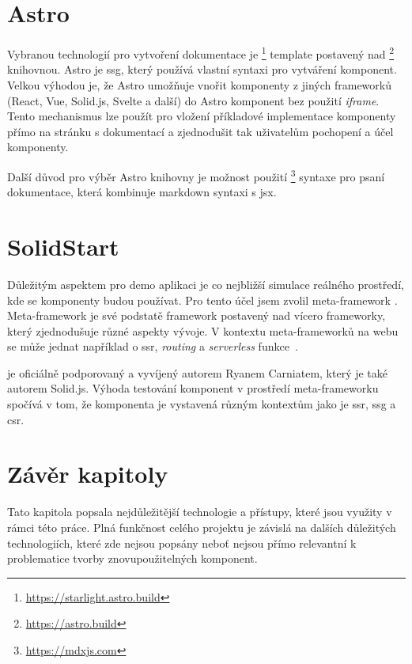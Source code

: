 \section{Astro}

Vybranou technologií pro vytvoření dokumentace je \footnote{\url{https://starlight.astro.build}} template postavený nad \footnote{\url{https://astro.build}} knihovnou.
Astro je \gls{ssg}, který používá vlastní syntaxi pro vytváření komponent.
Velkou výhodou je, že Astro umožňuje vnořit komponenty z jiných frameworků (React, Vue, Solid.js, Svelte a další) do Astro komponent bez použití \textit{iframe}.
Tento mechanismus lze použít pro vložení příkladové implementace komponenty přímo na stránku s dokumentací a zjednodušit tak uživatelům pochopení a účel komponenty.

Další důvod pro výběr Astro knihovny je možnost použití \footnote{\url{https://mdxjs.com}} syntaxe pro psaní dokumentace, která kombinuje markdown syntaxi s \gls{jsx}.

\section{SolidStart}


Důležitým aspektem pro demo aplikaci je co nejbližší simulace reálného prostředí, kde se komponenty budou používat.
Pro tento účel jsem zvolil meta-framework . Meta-framework je své podstatě framework postavený nad vícero frameworky, který zjednodušuje různé aspekty vývoje.
V kontextu meta-frameworků na webu se může jednat například o \gls{ssr}, \textit{routing} a \textit{serverless} funkce~\cite{prismic-metaframework}.

 je oficiálně podporovaný a vyvíjený autorem Ryanem Carniatem, který je také autorem Solid.js.
Výhoda testování komponent v prostředí meta-frameworku spočívá v tom, že komponenta je vystavená různým kontextům jako je \gls{ssr}, \gls{ssg} a \gls{csr}.

\section{Závěr kapitoly}


Tato kapitola popsala nejdůležitější technologie a přístupy, které jsou využity v rámci této práce.
Plná funkčnost celého projektu je závislá na dalších důležitých technologiích, které zde nejsou popsány neboť nejsou přímo relevantní k problematice tvorby znovupoužitelných komponent.

